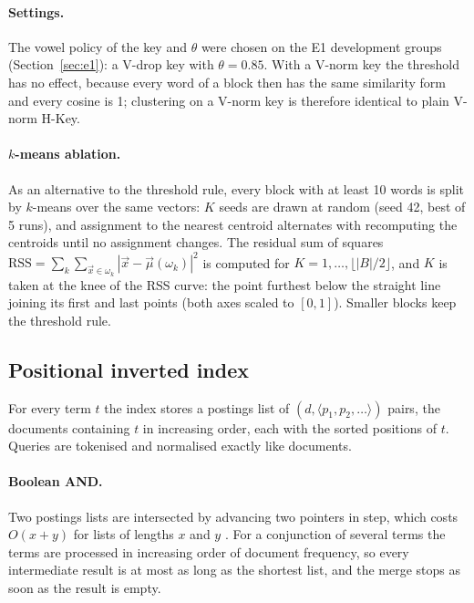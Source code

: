 \paragraph{Settings.} The vowel policy of the key and $\theta$ were chosen on the E1 development
groups (Section~\ref{sec:e1}): a V-drop key with $\theta=0.85$. With a V-norm key the threshold has no
effect, because every word of a block then has the same similarity form and every cosine is 1;
clustering on a V-norm key is therefore identical to plain V-norm H-Key.

\paragraph{$k$-means ablation.} As an alternative to the threshold rule, every block with at least
10 words is split by $k$-means \citep[Chapter~16]{manning2008iir} over the same vectors: $K$ seeds
are drawn at random (seed 42, best of 5 runs), and assignment to the nearest centroid alternates with
recomputing the centroids until no assignment changes. The residual sum of squares
$\mathrm{RSS}=\sum_{k}\sum_{\vec x\in\omega_k}|\vec x-\vec\mu(\omega_k)|^2$ is computed for
$K=1,\ldots,\lfloor|B|/2\rfloor$, and $K$ is taken at the knee of the RSS curve: the point furthest
below the straight line joining its first and last points (both axes scaled to $[0,1]$). Smaller
blocks keep the threshold rule.

\subsection{Positional inverted index}
\label{sec:index}

For every term $t$ the index stores a postings list of $(d, \langle p_1,p_2,\ldots\rangle)$ pairs,
the documents containing $t$ in increasing order, each with the sorted positions of $t$. Queries
are tokenised and normalised exactly like documents.

\paragraph{Boolean AND.} Two postings lists are intersected by advancing two pointers in step,
which costs $O(x+y)$ for lists of lengths $x$ and $y$ \citep[Figure~1.6]{manning2008iir}. For a
conjunction of several terms the terms are processed in increasing order of document frequency, so
every intermediate result is at most as long as the shortest list, and the merge stops as soon as
the result is empty.

